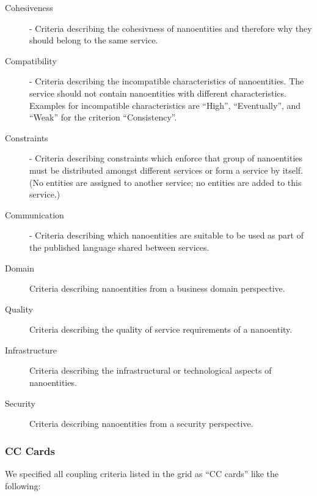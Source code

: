 \begin{description}
	\item[Cohesiveness] - Criteria describing the cohesivness of nanoentities and  therefore why they should belong to the same service. 
	\item[Compatibility] - Criteria describing the incompatible characteristics of nanoentities. The service should not contain nanoentities with different characteristics. Examples for incompatible characteristics are \enquote{High}, \enquote{Eventually}, and \enquote{Weak} for the criterion \enquote{Consistency}.
	\item[Constraints] - Criteria describing constraints which enforce that group of nanoentities must be distributed amongst different services or form a service by itself. (No entities are assigned to another service; no entities are added to this service.)
	\item[Communication] - Criteria describing which nanoentities are suitable to be used as part of the published language shared between services. 
	\item[Domain] Criteria describing nanoentities from a business domain perspective.
	\item[Quality] Criteria describing the quality of service requirements of a nanoentity.  
	\item[Infrastructure] Criteria describing the infrastructural or technological aspects of nanoentities.
	\item[Security] Criteria describing nanoentities from a security perspective.

\end{description}

\subsubsection{CC Cards}

We specified all coupling criteria listed in the grid as \enquote{CC cards} like the following:


